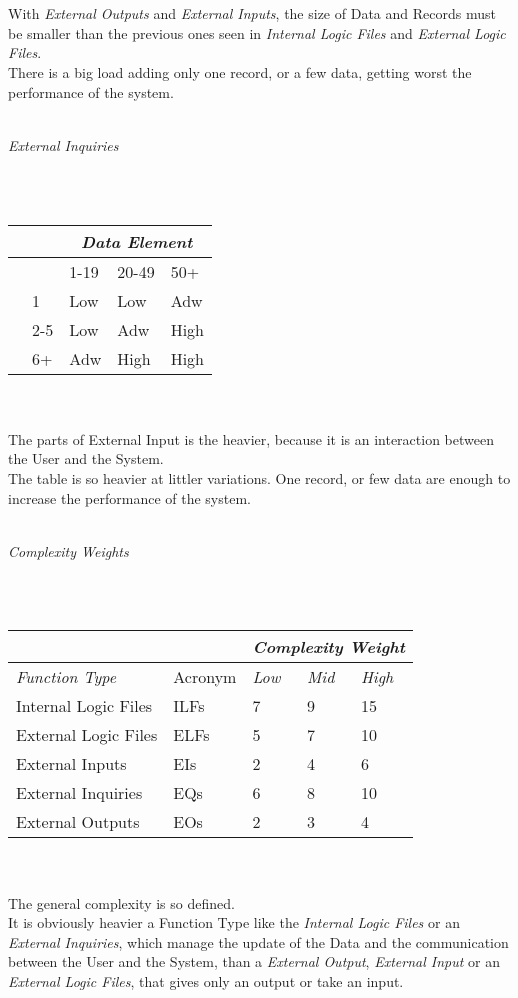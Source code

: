 \documentclass[11pt,a4paper]{report}
\begin{document}
\\\\
With \textit{External Outputs} and \textit{External Inputs}, the size of Data and Records must be smaller than the previous ones seen in \textit{Internal Logic Files} and \textit{External Logic Files}.\\There is a big load adding only one record, or a few data, getting worst the performance of the system.
\\\\
\centerline{\textit{External Inquiries}}
\\\\
\begin{tabularx}{\textwidth}{|p{1cm}|X|X|X|X|}
	\hline
	\multicolumn{2}{|X|}{} & \multicolumn{3}{c|}{\textit{Data Element}}\\
	\hline
	\multirow{1}{*}{}& & 1-19 & 20-49 & 50+\\ \cline{2-5}	
	\multirow{3}{*}{\rotatebox[origin=c]{90}{\parbox{10mm}{Record\\Elements}}}  & 1 & Low & Low & Adw\\
	& 2-5 & Low & Adw & High\\
	& 6+ & Adw & High & High\\
	\hline
\end{tabularx}
\\\\
The parts of External Input is the heavier, because it is an interaction between the User and the System.\\
The table is so heavier at littler variations. One record, or few data are enough to increase the performance of the system. 
\\\\
\centerline{\textit{Complexity Weights}}
\\\\
\begin{tabularx}{\textwidth}{|l|l|X|X|X|}
	\hline
	\multicolumn{2}{|X|}{} & \multicolumn{3}{c|}{\textit{Complexity Weight}}\\
	\hline
	\textit{Function Type} & Acronym & \textit{Low} & \textit{Mid} & \textit{High}\\
	\hline
	Internal Logic Files & ILFs & 7 & 9 & 15\\
	External Logic Files & ELFs & 5 & 7 & 10\\
	External Inputs & EIs & 2 & 4 & 6\\
	External Inquiries & EQs & 6 & 8 & 10\\
	External Outputs & EOs & 2 & 3 & 4\\
	\hline
\end{tabularx}
\\\\
The general complexity is so defined.\\
It is obviously heavier a Function Type like the \textit{Internal Logic Files} or an \textit{External Inquiries}, which manage the update of the Data and the communication between the User and the System, than a \textit{External Output}, \textit{External Input} or an \textit{External Logic Files}, that gives only an output or take an input.\\
\end{document}
